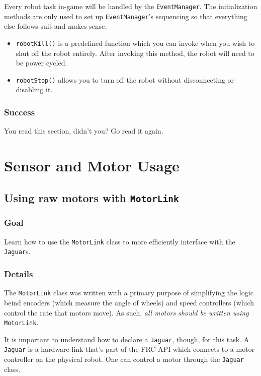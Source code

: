 \documentclass[a4paper]{article}
\begin{document}
Every robot task in-game will be handled by the \lstinline{EventManager}. The initialization methods are only used to set up \lstinline{EventManager}'s sequencing so that everything else follows suit and makes sense. \begin{itemize}\item{\lstinline{robotKill()} is a predefined function which you can invoke when you wish to shut off the robot entirely. After invoking this method, the robot will need to be power cycled.}\item{\lstinline{robotStop()} allows you to turn off the robot without disconnecting or disabling it.}\end{itemize}
\setcounter{subsubsection}{3}\subsubsection{Success} You read this section, didn't you? Go read it again.


\pagebreak\section{Sensor and Motor Usage}\setcounter{subsection}{3}

\subsection{Using raw motors with \lstinline{MotorLink}}
\subsubsection{Goal} Learn how to use the \lstinline{MotorLink} class to more efficiently interface with the \lstinline{Jaguar}s.
\subsubsection{Details} The \lstinline{MotorLink} class was written with a primary purpose of simplifying the logic beind encoders (which measure the angle of wheels) and speed controllers (which control the rate that motors move). As such, \textit{all motors should be written using} \lstinline{MotorLink}. 

It is important to understand how to declare a \lstinline{Jaguar}, though, for this task. A \lstinline{Jaguar} is a hardware link that's part of the FRC API which connects to a motor controller on the physical robot. One can control a motor through the \lstinline{Jaguar} class.
\end{document}
